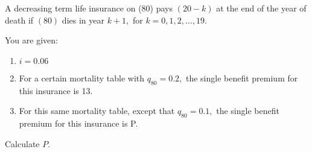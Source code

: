 A decreasing term life insurance on (80) pays $(20-k)$ at the end of the year of death if $(80)$
dies in year $k+1,$ for $k=0,1,2,\ldots,19.$

You are given:
\begin{enumerate}
\item $i=0.06$
\item For a certain mortality table with $q_{80} = 0.2,$ the single benefit premium for this insurance is 13.
\item For this same mortality table, except that $q_{80} = 0.1,$ the single benefit premium for this insurance is P.
\end{enumerate}
Calculate $P$.






